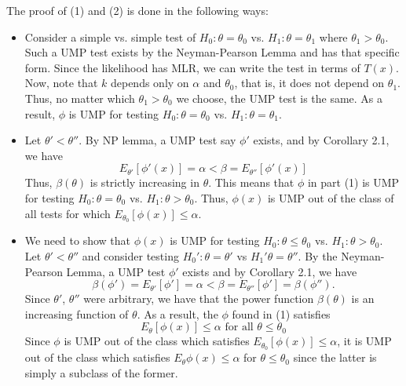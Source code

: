 \documentclass[12pt]{article}
\numberwithin{equation}{section}
\begin{document}
The proof of (1) and (2) is done in the following ways:
\begin{itemize}
  \item Consider a simple vs. simple test of $H_0: \theta = \theta_0$ vs. $H_1: \theta = \theta_1$ where $\theta_1 > \theta_0$. Such a UMP test exists by the Neyman-Pearson Lemma and has that specific form. Since the likelihood has MLR, we can write the test in terms of $T(x)$. Now, note that $k$ depends only on $\alpha$ and $\theta_0$, that is, it does not depend on $\theta_1$. Thus, no matter which $\theta_1 > \theta_0$ we choose, the UMP test is the same. As a result, $\phi$ is UMP for testing $H_0: \theta = \theta_0$ vs. $H_1: \theta = \theta_1$.
  \item Let $\theta' < \theta''$. By NP lemma, a UMP test say $\phi'$ exists, and by Corollary 2.1, we have
  \begin{equation*}
    E_{\theta'}[\phi'(x)] = \alpha < \beta = E_{\theta''}[\phi'(x)]
  \end{equation*}
  Thus, $\beta(\theta)$ is strictly increasing in $\theta$. This means that $\phi$ in part (1) is UMP for testing $H_0: \theta = \theta_0$ vs. $H_1: \theta > \theta_0$. Thus, $\phi(x)$ is UMP out of the class of all tests for which $E_{\theta_0}[\phi(x)] \le \alpha$. 
  \item We need to show that $\phi(x)$ is UMP for testing $H_0: \theta \le \theta_0$ vs. $H_1: \theta > \theta_0$. Let $\theta' < \theta''$ and consider testing $H_0': \theta = \theta'$ vs $H_1' \theta = \theta''$. By the Neyman-Pearson Lemma, a UMP test $\phi'$ exists and by Corollary 2.1, we have
  \begin{equation*}
  \beta(\phi') = E_{\theta'}[\phi'] = \alpha < \beta = E_{\theta''}[\phi'] = \beta(\phi'').
  \end{equation*}
  Since $\theta'$, $\theta''$ were arbitrary, we have that the power function $\beta(\theta)$ is an increasing function of $\theta$. As a result, the $\phi$ found in (1) satisfies
  \begin{equation*}
    E_{\theta}[\phi(x)] \le \alpha \text{ for all } \theta \le \theta_0
  \end{equation*}
  Since $\phi$ is UMP out of the class which satisfies $E_{\theta_0}[\phi(x)] \le \alpha$, it is UMP out of the class which satisfies
  $E_{\theta}\phi(x) \le \alpha$ for $\theta \le \theta_0$ since the latter is simply a subclass of the former.
\end{itemize}
\end{document}
